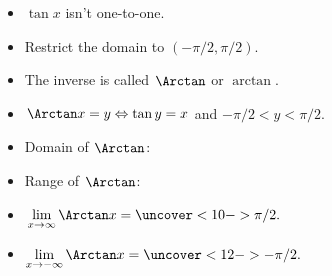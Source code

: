 \begin{frame}
\begin{columns}[c]
\ %
%
%
\begin{itemize}
\item<1->  $\tan x$ isn't one-to-one.
\item<2->  Restrict the domain to $(-\pi /2, \pi /2)$.
\item<3->  The inverse is called $\Arctan$ or $\arctan$.
\item<4->  $\Arctan x = y \Leftrightarrow \tan y = x$ and $-\pi /2 < y < \pi /2$.
\item<5->  \alert<handout:0| 5-6>{Domain of $\Arctan$: }
\item<5->  \alert<handout:0| 7-8>{Range of $\Arctan$: }
\item<9->  \alert<handout:0| 9-10>{$\displaystyle \lim_{x\rightarrow \infty} \Arctan x = \uncover<10->{\pi / 2.}$}
\item<9->  \alert<handout:0| 11-12>{$\displaystyle \lim_{x\rightarrow - \infty} \Arctan x = \uncover<12->{- \pi / 2.}$}
\end{itemize}
\end{columns}
\end{frame}
